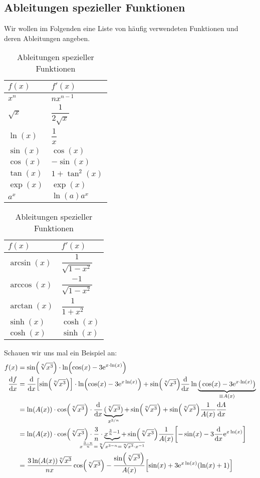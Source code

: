 \subsection{Ableitungen spezieller Funktionen}

Wir wollen im Folgenden eine Liste von häufig verwendeten Funktionen und deren Ableitungen angeben. 

\begin{table}[htp]
    \centering
    \caption{Ableitungen spezieller Funktionen}
    \begin{tabular}[t]{l l}
        \toprule
        $f(x)$ & $f'(x)$ \\
        \midrule 
        $x^n$ & $n x^{n-1}$ \\
        $\sqrt{x}$ & $\dfrac{1}{2\sqrt{x}}$ \\
        $\ln(x)$ & $\dfrac{1}{x}$ \\
        $\sin(x)$ & $\cos(x)$ \\
        $\cos(x)$ & $-\sin(x)$ \\ 
        $\tan(x)$ & $1 + \tan^2(x)$ \\
        $\exp(x)$ & $\exp(x)$ \\
        $a^x$ & $\ln(a) a^x$ 
    \end{tabular}
    \hspace{1cm}
    \begin{tabular}[t]{l l}
        \toprule
        $f(x)$ & $f'(x)$ \\
        \midrule 
        $\arcsin(x)$ & $\dfrac{1}{\sqrt{1-x^2}}$ \\
        $\arccos(x)$ & $\dfrac{-1}{\sqrt{1-x^2}}$ \\
        $\arctan(x)$ & $\dfrac{1}{1+x^2}$ \\
        $\sinh(x)$ & $\cosh(x)$ \\
        $\cosh(x)$ & $\sinh(x)$ \\
    \end{tabular}
\end{table}

Schauen wir uns mal ein Beispiel an: 
\begin{align}
    f(x) &= \sin(\sqrt[n]{x^3}) \cdot \ln(\cos(x)-3\e^{x\cdot \ln(x)}) \notag \\
    \dv{f}{x} &= \dv{x}\qty[\sin(\sqrt[n]{x^3})]\cdot \ln(\cos(x)- 3\e^{x\ln(x)}) + \sin(\sqrt[n]{x^3}) \dv{x} \ln\underbrace{\big(\cos(x)-3\e^{x\cdot \ln(x)}\big)}_{\equiv A(x)} \notag \\
    &= \ln(A(x)) \cdot \cos(\sqrt[n]{x^3}) \cdot \dv{x}\underbrace{(\sqrt[n]{x^3})}_{x^{3/n}} + \sin(\sqrt[n]{x^3}) + \sin(\sqrt[n]{x^3}) \frac{1}{A(x)} \dv{A}{x} \notag \\
    &= \ln(A(x)) \cdot \cos(\sqrt[n]{x^3}) \cdot \frac{3}{n} \cdot \underbrace{x^{\frac{3}{n}-1}}_{\mathclap{x^{\frac{3-n}{n}} =\sqrt[n]{x^{3-n} = \sqrt[n]{x^3}\cdot x^{-1}}}} + \sin(\sqrt[n]{x^3}) \frac{1}{A(x)}\qty[-\sin(x)-3 \dv{x}\e^{x \ln(x)}] \notag\\
    &= \frac{3 \ln(A(x)) \sqrt[n]{x^3}}{nx}\cos(\sqrt[n]{x^3}) - \frac{\sin(\sqrt[n]{x^3})}{A(x)} \qty[\sin(x)+3 \e^{x \ln(x)}(\ln(x)+1)]
\end{align}

